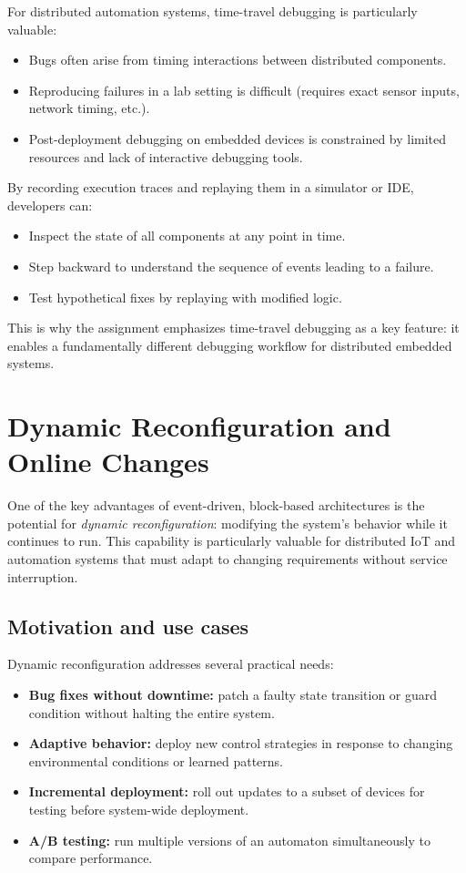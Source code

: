 For distributed automation systems, time-travel debugging is particularly valuable:
\begin{itemize}
  \item Bugs often arise from timing interactions between distributed components.
  \item Reproducing failures in a lab setting is difficult (requires exact sensor inputs, network timing, etc.).
  \item Post-deployment debugging on embedded devices is constrained by limited resources and lack of interactive debugging tools.
\end{itemize}

By recording execution traces and replaying them in a simulator or IDE, developers can:
\begin{itemize}
  \item Inspect the state of all components at any point in time.
  \item Step backward to understand the sequence of events leading to a failure.
  \item Test hypothetical fixes by replaying with modified logic.
\end{itemize}

This is why the assignment emphasizes time-travel debugging as a key feature: it enables a fundamentally different debugging workflow for distributed embedded systems.

\section{Dynamic Reconfiguration and Online Changes}

One of the key advantages of event-driven, block-based architectures is the potential for \emph{dynamic reconfiguration}: modifying the system's behavior while it continues to run.
This capability is particularly valuable for distributed IoT and automation systems that must adapt to changing requirements without service interruption.

\subsection{Motivation and use cases}

Dynamic reconfiguration addresses several practical needs:
\begin{itemize}
  \item \textbf{Bug fixes without downtime:} patch a faulty state transition or guard condition without halting the entire system.
  \item \textbf{Adaptive behavior:} deploy new control strategies in response to changing environmental conditions or learned patterns.
  \item \textbf{Incremental deployment:} roll out updates to a subset of devices for testing before system-wide deployment.
  \item \textbf{A/B testing:} run multiple versions of an automaton simultaneously to compare performance.
\end{itemize}


